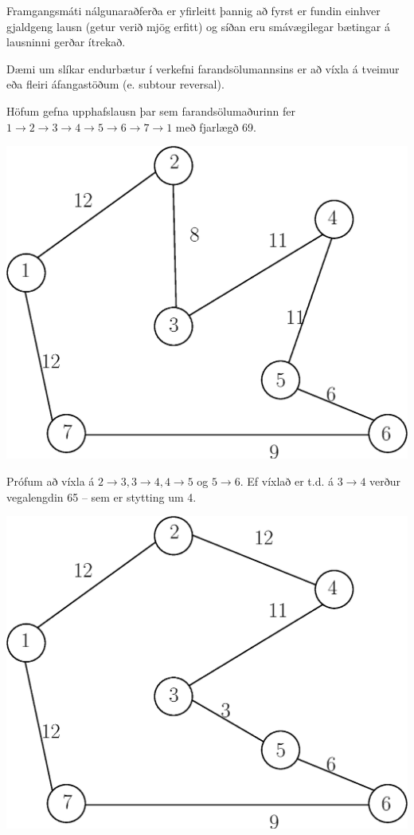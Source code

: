 Framgangsmáti nálgunaraðferða er yfirleitt þannig að fyrst er fundin einhver gjaldgeng lausn (getur verið mjög erfitt) og síðan eru smávægilegar bætingar á lausninni gerðar ítrekað.

Dæmi um slíkar endurbætur í verkefni farandsölumannsins er að víxla á tveimur eða fleiri áfangastöðum (e. subtour reversal).

\begin{lausnSYND}Höfum gefna upphafslausn þar sem farandsölumaðurinn fer $1\to2\to3\to4\to5\to6\to7\to1$ með fjarlægð 69.
\begin{center}
  \includegraphics[width=0.6\columnwidth]{figs/tsp_12345671.eps}
\end{center}
Prófum að víxla á $2\to3,3\to4,4\to5$ og $5\to6$. 
\newpage
Ef víxlað er t.d. á $3\to4$ verður vegalengdin 65 -- sem er stytting um 4.
\begin{center}
  \includegraphics[width=0.5\columnwidth]{figs/tsp_12435671.eps}
\end{center}


\end{lausnSYND}
